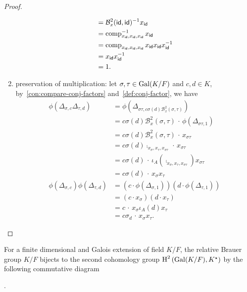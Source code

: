 \begin{proof}
\begin{enumerate}
\[\begin{aligned}
            &= \mathcal{B}^{2}_{x}(\mathsf{id},\mathsf{id})^{-1} x_{\mathsf{id}} \\
            &= \operatorname{comp}_{x_{\mathsf{id}},x_{\mathsf{id}},x_{\mathsf{id}}}^{-1} x_{\mathsf{id}} \\
            &= \operatorname{comp}_{x_{\mathsf{id}},x_{\mathsf{id}},x_{\mathsf{id}}} x_{\mathsf{id}} x_{\mathsf{id}} x_{\mathsf{id}}^{-1} \\
            &= x_{\mathsf{id}} x_{\mathsf{id}}^{-1} \\
            &= 1.
          \end{aligned}
          \]
    \item preservation of multiplication: let $\sigma,\tau\in\operatorname{Gal}(K/F)$ and $c,d \in K$, by~\cref{con:compare-conj-factors} and~\cref{def:conj-factor}, we have
          \[
          \begin{aligned}
            \phi\left(\Delta_{\sigma,c}\Delta_{\tau,d}\right)
            &= \phi\left(\Delta_{\sigma\tau, c\sigma(d)\mathcal{B}^{2}_{x}(\sigma,\tau)}\right) \\
            &= c\sigma(d)\mathcal{B}^{2}_{x}(\sigma,\tau) \,\cdot\, \phi\left(\Delta_{\sigma\tau, 1}\right) \\
            &= c\sigma(d)\mathcal{B}^{2}_{x}(\sigma,\tau) \,\cdot\, x_{\sigma\tau} \\
            &= c\sigma(d)\comp_{x_{\sigma},x_{\tau},x_{\sigma\tau}} \,\cdot\, x_{\sigma\tau} \\
            &= c\sigma(d)\,\cdot\, \iota_{A}\left(\comp_{x_{\sigma},x_{\tau},x_{\sigma\tau}}\right)x_{\sigma\tau} \\
            &= c\sigma(d) \,\cdot\, x_{\sigma}x_{\tau}\\
            \phi\left(\Delta_{\sigma,c}\right)\phi\left(\Delta_{\tau,d}\right)
            &=\left(c \cdot \phi\left(\Delta_{\sigma, 1}\right)\right)
              \left(d \cdot \phi\left(\Delta_{\tau, 1}\right)\right) \\
            &= \left(c \cdot x_{\sigma}\right) \left(d \cdot x_{\tau}\right)\\
            &= c \,\cdot\, x_{\sigma}\iota_{A}(d) x_{\tau} \\
            &= c\sigma_{d} \,\cdot\, x_{\sigma}x_{\tau}.
          \end{aligned}
          \]
  \end{enumerate}
\end{proof}

\begin{corollary}
  For a finite dimensional and Galois extension of field $K/F$, the relative Brauer group $K/F$ bijects to the second cohomology group $\operatorname{H}^{2}\left(\operatorname{Gal}(K/F), K^{\star}\right)$ by the following commutative diagram
  \begin{center}
  .
\end{center}
\leanok
{}
\end{corollary}


